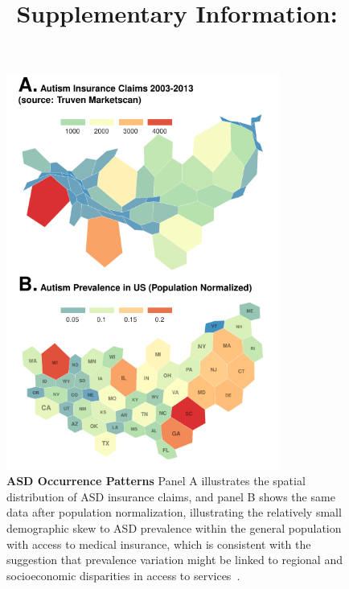 \documentclass[onecolumn,,10pt]{IEEEtran}
\renewcommand{\captionN}[1]{\caption{\color{CadetBlue4!80!black} \sffamily \fontsize{9}{10}\selectfont #1  }}
\newif\ifFIGS
\begin{document}

\title{{\Large\bf Supplementary Information:}\\\TITLE}
\maketitle

\tableofcontents
\listoftables

\clearpage



\clearpage
\ifFIGS
\begin{figure}[!ht]
  \centering
  \includegraphics[width=0.8\textwidth]{Figures/External/occurv}

  \captionN{\textbf{ASD Occurrence Patterns}  Panel A illustrates the spatial distribution of ASD insurance claims, and panel B shows the same data after population normalization, illustrating the relatively small demographic skew to ASD prevalence within the general population with access to medical insurance, which is consistent with the suggestion that prevalence variation might be linked to regional and socioeconomic disparities in access to services~\cite{jarquin2011racial}.}\label{figocc}
    \vspace{-5pt}

\end{figure}
\end{document}
